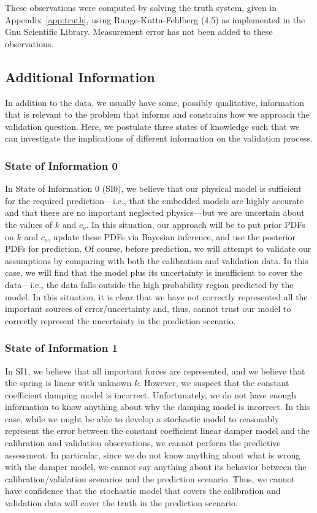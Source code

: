 \documentclass[11pt]{article}
\begin{document}
% 
These observations were computed by solving the truth system,
given in Appendix~\ref{app:truth}, using Runge-Kutta-Fehlberg (4,5) as
implemented in the Gnu Scientific Library.  Measurement error
has not been added to these observations.

\subsection{Additional Information}
In addition to the data, we usually have some, possibly qualitative,
information that is relevant to the problem that informs and
constrains how we approach the validation question.  Here, we
postulate three states of knowledge such that we can investigate the
implications of different information on the validation process.

\subsubsection{State of Information 0} \label{sec:SI0}
In State of Information 0 (SI0), we believe that our physical model is
sufficient for the required prediction---i.e., that the embedded
models are highly accurate and that there are no important neglected
physics---but we are uncertain about the values of $k$ and $c_o$.  In
this situation, our approach will be to put prior PDFs on $k$ and
$c_o$, update these PDFs via Bayesian inference, and use the posterior
PDFs for prediction.  Of course, before prediction, we will attempt to
validate our assumptions by comparing with both the calibration and
validation data.  In this case, we will find that the model plus its
uncertainty is insufficient to cover the data---i.e., the data falls
outside the high probability region predicted by the model.  In this
situation, it is clear that we have not correctly represented all the
important sources of error/uncertainty and, thus, cannot trust our
model to correctly represent the uncertainty in the prediction
scenario.

\subsubsection{State of Information 1} \label{sec:SI1}
In SI1, we believe that all important forces are represented, and we
believe that the spring is linear with unknown $k$.  However, we
suspect that the constant coefficient damping model is incorrect.
Unfortunately, we do not have enough information to know anything
about why the damping model is incorrect.  In this case, while we
might be able to develop a stochastic model to reasonably represent
the error between the constant coefficient linear damper model and the
calibration and validation observations, we cannot perform the
predictive assessment.  In particular, since we do not know anything
about what is wrong with the damper model, we cannot say anything
about its behavior between the calibration/validation scenarios and
the prediction scenario.  Thus, we cannot have confidence that the
stochastic model that covers the calibration and validation data will
cover the truth in the prediction scenario.
\end{document}
